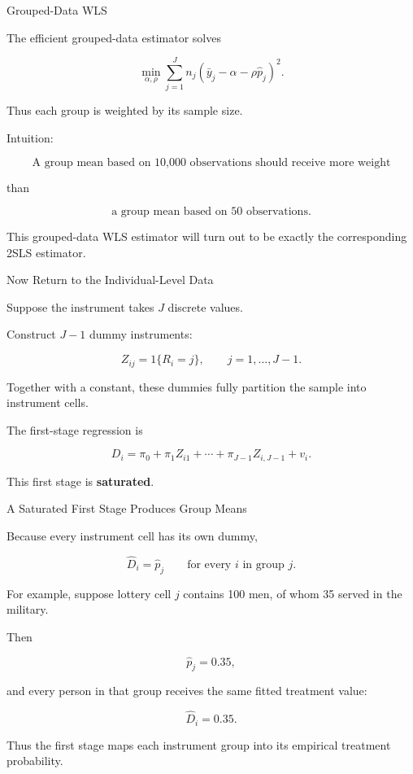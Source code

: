 \documentclass[aspectratio=169]{beamer}
\begin{document}
\begin{frame}{Grouped-Data WLS}

The efficient grouped-data estimator solves

\[
\boxed{
\min_{\alpha,\rho}
\sum_{j=1}^J
n_j
\left(
\bar y_j-\alpha-\rho\hat p_j
\right)^2.
}
\]

Thus each group is weighted by its sample size.

\vspace{0.4cm}

Intuition:

\[
\boxed{
\text{A group mean based on 10,000 observations should receive more weight}
}
\]

than

\[
\boxed{
\text{a group mean based on 50 observations.}
}
\]

This grouped-data WLS estimator will turn out to be exactly the corresponding 2SLS estimator.

\end{frame}

\begin{frame}{Now Return to the Individual-Level Data}

Suppose the instrument takes \(J\) discrete values.

Construct \(J-1\) dummy instruments:

\[
Z_{ij}=1\{R_i=j\},
\qquad
j=1,\ldots,J-1.
\]

Together with a constant, these dummies fully partition the sample into instrument cells.

The first-stage regression is

\[
D_i
=
\pi_0
+
\pi_1Z_{i1}
+\cdots+
\pi_{J-1}Z_{i,J-1}
+
v_i.
\]

This first stage is \textbf{saturated}.

\end{frame}

\begin{frame}{A Saturated First Stage Produces Group Means}

Because every instrument cell has its own dummy,

\[
\boxed{
\hat D_i=\hat p_j
\qquad
\text{for every }i\text{ in group }j.
}
\]

For example, suppose lottery cell \(j\) contains 100 men, of whom 35 served in the military.

Then

\[
\hat p_j=0.35,
\]

and every person in that group receives the same fitted treatment value:

\[
\hat D_i=0.35.
\]

Thus the first stage maps each instrument group into its empirical treatment probability.

\end{frame}
\end{document}
